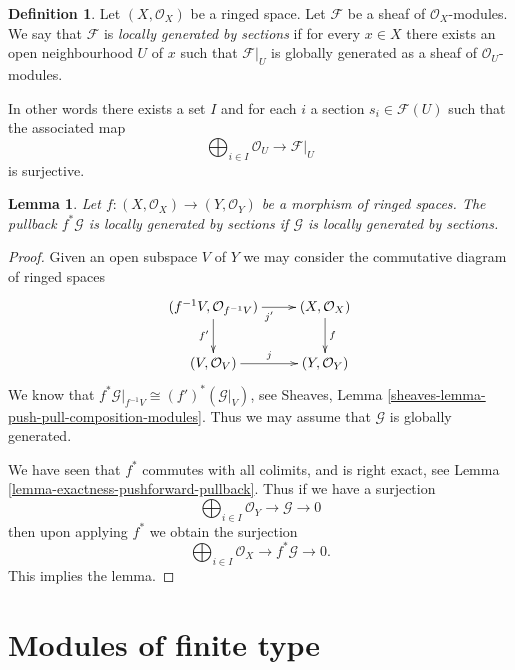 \documentclass{stacks-project}
\theoremstyle{plain}
\newtheorem{lemma}[subsection]{Lemma}
\theoremstyle{definition}
\newtheorem{definition}[subsection]{Definition}
\theoremstyle{remark}
\numberwithin{equation}{subsection}
\begin{document}
\begin{definition}
\label{definition-locally-generated}
Let $(X, \mathcal{O}_X)$ be a ringed space.
Let $\mathcal{F}$ be a sheaf of $\mathcal{O}_X$-modules.
We say that $\mathcal{F}$ is {\it locally generated by sections}
if for every $x \in X$ there exists an open
neighbourhood $U$ of $x$ such that $\mathcal{F}|_U$
is globally generated as a sheaf of $\mathcal{O}_U$-modules.
\end{definition}

\noindent
In other words there exists a set $I$ and for
each $i$ a section $s_i \in \mathcal{F}(U)$ such
that the associated map
$$
\bigoplus\nolimits_{i \in I} \mathcal{O}_U
\longrightarrow
\mathcal{F}|_U
$$
is surjective.

\begin{lemma}
\label{lemma-pullback-locally-generated}
Let $f : (X, \mathcal{O}_X) \to (Y, \mathcal{O}_Y)$
be a morphism of ringed spaces.
The pullback $f^*\mathcal{G}$ is locally generated by sections
if $\mathcal{G}$ is locally generated by sections.
\end{lemma}

\begin{proof}
Given an open subspace $V$ of $Y$ we may
consider the commutative diagram of ringed spaces
$$
\xymatrix{
(f^{-1}V, \mathcal{O}_{f^{-1}V}) \ar[r]_{j'} \ar[d]_{f'} &
(X, \mathcal{O}_X) \ar[d]^f \\
(V, \mathcal{O}_V) \ar[r]^j &
(Y, \mathcal{O}_Y)
}
$$
We know that $f^*\mathcal{G}|_{f^{-1}V} \cong (f')^*(\mathcal{G}|_V)$,
see Sheaves, Lemma \ref{sheaves-lemma-push-pull-composition-modules}.
Thus we may assume that $\mathcal{G}$ is globally generated.

\medskip\noindent
We have seen that $f^*$ commutes with all colimits,
and is right exact, see Lemma \ref{lemma-exactness-pushforward-pullback}.
Thus if we have a surjection
$$
\bigoplus\nolimits_{i \in I}
\mathcal{O}_Y
\to
\mathcal{G}
\to
0
$$
then upon applying $f^*$ we obtain the surjection
$$
\bigoplus\nolimits_{i \in I}
\mathcal{O}_X
\to
f^*\mathcal{G}
\to
0.
$$
This implies the lemma.
\end{proof}












\section{Modules of finite type}
\label{section-finite-type}
\end{document}
